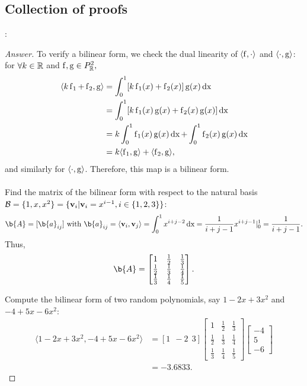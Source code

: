 \subsection{Collection of proofs}

\noindent {}:
\begin{proof}[Answer]
\label{answer:bf1}
  To verify a bilinear form, we check the dual linearity of $\langle \operatorname{f}, \cdot \rangle$ and $\langle \cdot, \operatorname{g} \rangle$: for $\forall k \in \mathbb{R}$ and $\operatorname{f},\operatorname{g} \in P^2_{\mathbb{R}},$
%
\begin{align*}
    \langle k\operatorname{f}_1 + \operatorname{f}_2, \operatorname{g} \rangle 
&= \int_{0}^1 [k\operatorname{f}_1(x)+\operatorname{f}_2(x)] \operatorname{g}(x) \operatorname{d\textnormal{x}} \\
&= \int_{0}^1 [k\operatorname{f}_1(x)\operatorname{g}(x) +\operatorname{f}_2(x)\operatorname{g}(x)] \operatorname{d\textnormal{x}} \\
&= k\int_{0}^1 \operatorname{f}_1(x)\operatorname{g}(x) \operatorname{d\textnormal{x}}  + \int_{0}^1 \operatorname{f}_2(x)\operatorname{g}(x) \operatorname{d\textnormal{x}} \\
&= k\langle \operatorname{f}_1, \operatorname{g} \rangle + \langle \operatorname{f}_2, \operatorname{g} \rangle,
\end{align*}
%
and similarly for $\langle \cdot, \operatorname{g} \rangle$.
Therefore, this map is a bilinear form.\\

\noindent\\
\noindent Find the matrix of the bilinear form with respect to the natural basis $\mathcal{B} = \{1, x, x^2 \} = \{ \mathbf{v}_i | \mathbf{v}_i = x^{i-1}, i \in \{1,2,3\} \}$:\\
%
\begin{equation*}
    \b{A} = [\b{a}_{ij}] \textnormal{  with  } \b{a}_{ij} = \langle \vv_i, \vv_j \rangle 
    = \int_{0}^1 x^{i+j-2} \operatorname{d\textnormal{x}}
    = \frac{1}{i+j-1} x^{i+j-1} \vert_{0}^1
    = \frac{1}{i+j-1}.
\end{equation*}
%
Thus,
$$\b{A}=
    \begin{bmatrix}
        1   &\frac12  &\frac13\\
        \frac12    &\frac13  &\frac14\\
        \frac13    &\frac14  &\frac15
    \end{bmatrix}.
$$

\noindent Compute the bilinear form of two random polynomials, say $1 -2x +3x^2$ and $-4 +5x -6x^2$:
%
\begin{align*}
    \langle 1 -2x +3x^2, -4 +5x -6x^2 \rangle 
    &= [1 ~\ -2 ~\ 3]
\begin{bmatrix}
1   &\frac12  &\frac13\\
\frac12    &\frac13  &\frac14\\
\frac13    &\frac14  &\frac15
\end{bmatrix}
\begin{bmatrix}
-4\\ 
5\\ 
-6
\end{bmatrix}\\
&= -3.6833.
\end{align*}

\end{proof}
\vspace{1cm}

